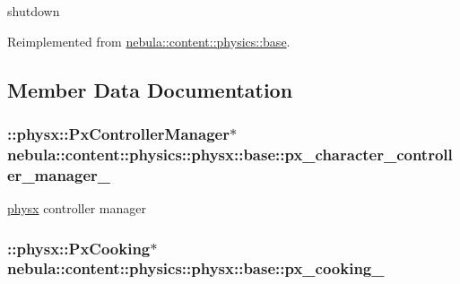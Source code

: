 shutdown 

Reimplemented from \hyperlink{classnebula_1_1content_1_1physics_1_1base_aeb6cf6fb210e1c83b1adef563470c737}{nebula::content::physics::base}.

\subsection{Member Data Documentation}
\hypertarget{classnebula_1_1content_1_1physics_1_1physx_1_1base_a5be7d9af5b7dcf31e4415b0bccc37d8a}{
\subsubsection[{px\_\-character\_\-controller\_\-manager\_\-}]{\setlength{\rightskip}{0pt plus 5cm}::physx::PxControllerManager$\ast$ {\bf nebula::content::physics::physx::base::px\_\-character\_\-controller\_\-manager\_\-}}}
\label{classnebula_1_1content_1_1physics_1_1physx_1_1base_a5be7d9af5b7dcf31e4415b0bccc37d8a}


\hyperlink{namespacenebula_1_1content_1_1physics_1_1physx}{physx} controller manager \hypertarget{classnebula_1_1content_1_1physics_1_1physx_1_1base_a44f7e5a7f4bef961365059596c7cdfb8}{
\subsubsection[{px\_\-cooking\_\-}]{\setlength{\rightskip}{0pt plus 5cm}::physx::PxCooking$\ast$ {\bf nebula::content::physics::physx::base::px\_\-cooking\_\-}}}
\label{classnebula_1_1content_1_1physics_1_1physx_1_1base_a44f7e5a7f4bef961365059596c7cdfb8}



